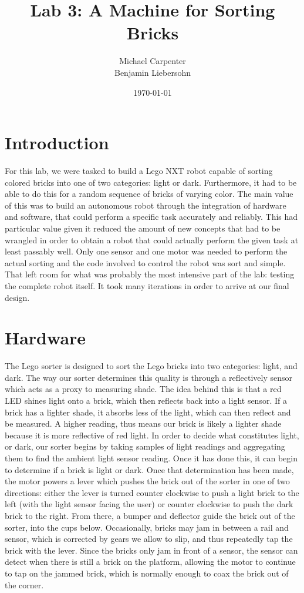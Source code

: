 \documentclass{article}
\title{Lab 3: A Machine for Sorting Bricks}
\author{Michael Carpenter \\ Benjamin Liebersohn}
\date{\today}
\begin{document}
\maketitle

\section{Introduction}
For this lab, we were tasked to build a Lego NXT robot capable of sorting colored bricks into one of two categories: light or dark.
Furthermore, it had to be able to do this for a random sequence of bricks of varying color.
The main value of this was to build an autonomous robot through the integration of hardware and software, that could perform a specific task accurately and reliably. 
This had particular value given it reduced the amount of new concepts that had to be wrangled in order to obtain a robot that could actually perform the given task at least passably well.
Only one sensor and one motor was needed to perform the actual sorting and the code involved to control the robot was sort and simple.
That left room for what was probably the most intensive part of the lab: testing the complete robot itself. It took many iterations in order to arrive at our final design.

\section{Hardware}
The Lego sorter is designed to sort the Lego bricks into two categories: light, and dark.
The way our sorter determines this quality is through a reflectively sensor which acts as a proxy to measuring shade.
The idea behind this is that a red LED shines light onto a brick, which then reflects back into a light sensor.
If a brick has a lighter shade, it absorbs less of the light, which can then reflect and be measured.
A higher reading, thus means our brick is likely a lighter shade because it is more reflective of red light.
In order to decide what constitutes light, or dark, our sorter begins by taking samples of light readings and aggregating them to find the ambient light sensor reading.
Once it has done this, it can begin to determine if a brick is light or dark. 
Once that determination has been made, the motor powers a lever which pushes the brick out of the sorter in one of two directions: either the lever is turned counter clockwise to push a light brick to the left (with the light sensor facing the user) or counter clockwise to push the dark brick to the right.
From there, a bumper and deflector guide the brick out of the sorter, into the cups below.
Occasionally, bricks may jam in between a rail and sensor, which is corrected by gears we allow to slip, and thus repeatedly tap the brick with the lever. 
Since the bricks only jam in front of a sensor, the sensor can detect when there is still a brick on the platform, allowing the motor to continue to tap on the jammed brick, which is normally enough to coax the brick out of the corner.
\end{document}
